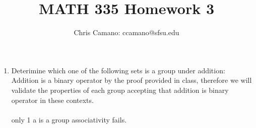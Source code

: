 \documentclass[11pt]{article}
\author{Chris Camano: ccamano@sfsu.edu}
\title{MATH 335  Homework 3 }
\date
\theoremstyle{definition}  %
\begin{document}
\maketitle

\begin{enumerate}
\item Deterimine which one of the following sets is a group under addition:
Addition is a binary operator by the proof provided in class, therefore we will validate the properties of each group accepting that addition is binary operator in these contexts.\\\\
only 1 a is a group associativity fails.
\\\\


\end{enumerate}
\end{document}
